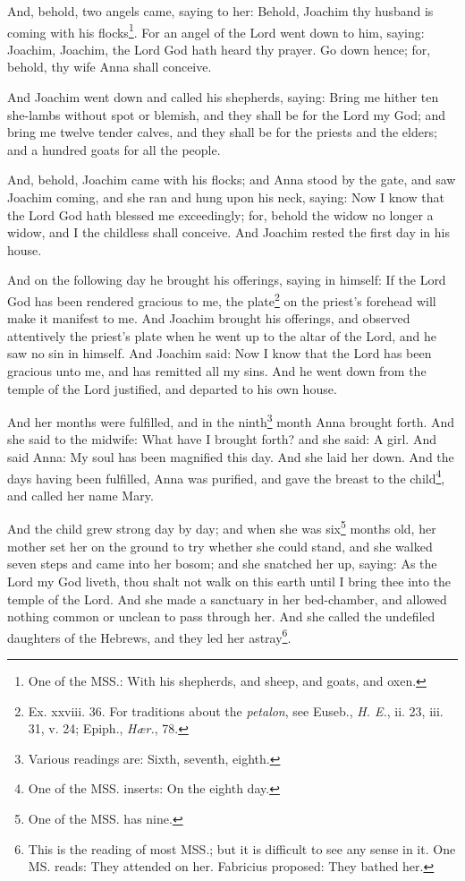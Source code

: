 \pend\pstart
And, behold, two angels came, saying to her: Behold, Joachim thy husband is coming with his
flocks\footnote{One of the MSS.: With his shepherds, and sheep, and goats, and oxen.}. For an angel of the Lord went down to him, saying: Joachim, Joachim, the Lord God hath heard thy prayer. Go down hence; for, behold, thy wife Anna shall conceive.

\pend\pstart
And Joachim went down and called his shepherds, saying: Bring me hither ten she-lambs without spot or blemish, and they shall be for the Lord my God; and bring me twelve tender calves, and they shall be for the priests and the elders; and a hundred goats for all the people.

\pend\pstart
And, behold, Joachim came with his flocks; and Anna stood by the gate, and saw Joachim coming, and she ran and hung upon his neck, saying: Now I know that the Lord God hath blessed me exceedingly; for, behold the widow no longer a widow, and I the childless shall conceive. And Joachim rested the first day in his house.

\pend\pstart
{}

\pend\pstart
And on the following day he brought his offerings, saying in himself: If the Lord God has been rendered gracious to me, the plate\footnote{Ex. xxviii. 36. For traditions about the \textit{petalon}, see Euseb., \textit{H. E.}, ii. 23, iii. 31, v. 24; Epiph., \textit{Hær.}, 78.} on the priest's forehead will make it manifest to me. And Joachim brought his offerings, and observed attentively the priest's plate when he went up to the altar of the Lord, and he saw no sin in himself. And Joachim said: Now I know that the Lord has been gracious unto me, and has remitted all my sins. And he went down from the temple of the Lord justified, and departed to his own house.

\pend\pstart
And her months were fulfilled, and in the ninth\footnote{Various readings are: Sixth, seventh, eighth.} month Anna brought forth. And she said to the midwife: What have I brought forth? and she said: A girl. And said Anna: My soul has been magnified this day. And she laid her down. And the days having been fulfilled, Anna was purified, and gave the breast to the child\footnote{One of the MSS. inserts: On the eighth day.}, and called her name Mary.

\pend\pstart
{}

\pend\pstart
And the child grew strong day by day; and when she was six\footnote{One of the MSS. has nine.} months old, her mother set her on the ground to try whether she could stand, and she walked seven steps and came into her bosom; and she snatched her up, saying: As the Lord my God liveth, thou shalt not walk on this earth until I bring thee into the temple of the Lord. And she made a sanctuary in her bed-chamber, and allowed nothing common or unclean to pass through her. And she called the undefiled daughters of the Hebrews, and they led her astray\footnote{This is the reading of most MSS.; but it is difficult to see any sense in it. One MS. reads: They attended on her. Fabricius proposed: They bathed her.}.

